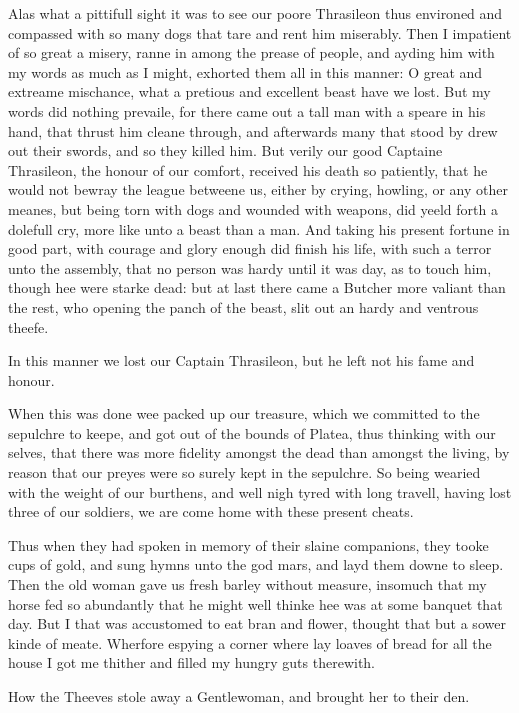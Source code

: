Alas what a pittifull sight it was to see our poore Thrasileon thus environed
and compassed with so many dogs that tare and rent him miserably. Then I
impatient of so great a misery, ranne in among the prease of people, and ayding
him with my words as much as I might, exhorted them all in this manner: O great
and extreame mischance, what a pretious and excellent beast have we lost. But
my words did nothing prevaile, for there came out a tall man with a speare in
his hand, that thrust him cleane through, and afterwards many that stood by
drew out their swords, and so they killed him. But verily our good Captaine
Thrasileon, the honour of our comfort, received his death so patiently, that he
would not bewray the league betweene us, either by crying, howling, or any
other meanes, but being torn with dogs and wounded with weapons, did yeeld
forth a dolefull cry, more like unto a beast than a man. And taking his present
fortune in good part, with courage and glory enough did finish his life, with
such a terror unto the assembly, that no person was hardy until it was day, as
to touch him, though hee were starke dead: but at last there came a Butcher
more valiant than the rest, who opening the panch of the beast, slit out an
hardy and ventrous theefe.

In this manner we lost our Captain Thrasileon, but he left not his fame and
honour.

When this was done wee packed up our treasure, which we committed to the
sepulchre to keepe, and got out of the bounds of Platea, thus thinking with our
selves, that there was more fidelity amongst the dead than amongst the living,
by reason that our preyes were so surely kept in the sepulchre. So being
wearied with the weight of our burthens, and well nigh tyred with long travell,
having lost three of our soldiers, we are come home with these present cheats.

Thus when they had spoken in memory of their slaine companions, they tooke cups
of gold, and sung hymns unto the god mars, and layd them downe to sleep. Then
the old woman gave us fresh barley without measure, insomuch that my horse fed
so abundantly that he might well thinke hee was at some banquet that day. But I
that was accustomed to eat bran and flower, thought that but a sower kinde of
meate. Wherfore espying a corner where lay loaves of bread for all the house I
got me thither and filled my hungry guts therewith.


How the Theeves stole away a Gentlewoman, and brought her to their den.

